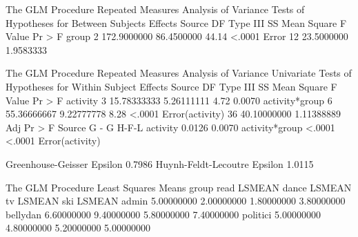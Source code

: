 \documentclass{article}
\begin{document}
\begin{Woutput}
The GLM Procedure
Repeated Measures Analysis of Variance
Tests of Hypotheses for Between Subjects Effects
Source                     DF    Type III SS    Mean Square   F Value   Pr > F
group                       2    172.9000000     86.4500000     44.14   <.0001
Error                      12     23.5000000      1.9583333

The GLM Procedure
Repeated Measures Analysis of Variance
Univariate Tests of Hypotheses for Within Subject Effects
Source                     DF    Type III SS    Mean Square   F Value   Pr > F
activity                    3    15.78333333     5.26111111      4.72   0.0070
activity*group              6    55.36666667     9.22777778      8.28   <.0001
Error(activity)            36    40.10000000     1.11388889
                          Adj Pr > F
Source                  G - G     H-F-L
activity               0.0126    0.0070
activity*group         <.0001    <.0001
Error(activity)

Greenhouse-Geisser Epsilon      0.7986
Huynh-Feldt-Lecoutre Epsilon    1.0115

The GLM Procedure
Least Squares Means
group        read LSMEAN    dance LSMEAN       tv LSMEAN      ski LSMEAN
admin         5.00000000      2.00000000      1.80000000      3.80000000
bellydan      6.60000000      9.40000000      5.80000000      7.40000000
politici      5.00000000      4.80000000      5.20000000      5.00000000
\end{Woutput}
\end{document}

